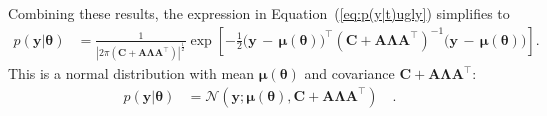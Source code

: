 \documentclass[modern]{rnaastex}
\renewcommand{\eqref}[1]{\ref{eq:#1}}
\newcommand{\Eq}[1]{Equation~(\eqref{#1})}
\newcommand{\eq}[1]{\Eq{#1}}
\newcommand{\eqlabel}[1]{\label{eq:#1}}
\newcommand{\bvec}[1]{{\ensuremath{\boldsymbol{#1}}}}
\newcommand{\Normal}{\ensuremath{\mathcal{N}}}
\newcommand{\mA}{\ensuremath{\bvec{A}}}
\newcommand{\mC}{\ensuremath{\bvec{C}}}
\newcommand{\mL}{\ensuremath{\bvec{\Lambda}}}
\newcommand{\vy}{\ensuremath{\bvec{y}}}
\newcommand{\vt}{\ensuremath{\bvec{\theta}}}
\newcommand{\vm}{\ensuremath{\bvec{\mu}(\bvec{\theta})}}
\begin{document}
%
Combining these results, the expression in \eq{p(y|t)ugly} simplifies to
\begin{align}
\eqlabel{p(y|t)exp}
p(\vy | \vt) &= \frac{1}{
                |2\pi(\mC {+} \mA \mL \mA^\top)|^\frac{1}{2}}
                \exp \left[ {-}\frac{1}{2} \big( \vy\,{-}\,\vm \big)^\top
                            (\mC {+} \mA \mL \mA^\top)^{-1}
                            \big( \vy\,{-}\,\vm \big)
                     \right].
\end{align}
%
This is a normal distribution with mean $\vm$ and covariance
$\mC + \mA \mL \mA^\top$:
%
\begin{align}
\eqlabel{p(y|t)normal_app}
p(\vy | \vt) &= \Normal (\vy; \vm, \mC + \mA \mL \mA^\top) \quad.
\end{align}
\end{document}

